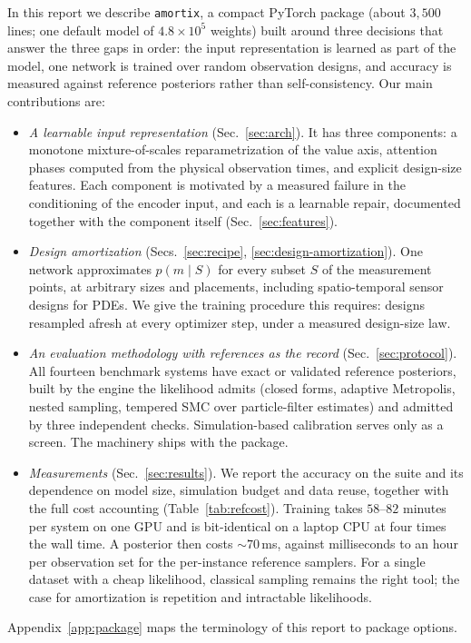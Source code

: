 \documentclass[10pt]{article}
\newcommand{\amortix}{\texttt{amortix}}
\begin{document}
In this report we describe \amortix, a compact PyTorch package (about $3{,}500$ lines; one default
model of $4.8 \times 10^5$ weights) built around three decisions that answer the three gaps in order:
the input representation is learned as part of the model, one network is trained over random
observation designs, and accuracy is measured against reference posteriors rather than
self-consistency. Our main contributions are:
\begin{itemize}
  \item \emph{A learnable input representation} (Sec.~\ref{sec:arch}). It has three components: a
  monotone mixture-of-scales reparametrization of the value axis, attention phases computed from the
  physical observation times, and explicit design-size features. Each component is motivated by a
  measured failure in the conditioning of the encoder input, and each is a learnable repair,
  documented together with the component itself (Sec.~\ref{sec:features}).
  \item \emph{Design amortization} (Secs.~\ref{sec:recipe}, \ref{sec:design-amortization}). One
  network approximates $p(m \mid S)$ for every subset $S$ of the measurement points, at arbitrary
  sizes and placements, including spatio-temporal sensor designs for PDEs. We give the training
  procedure this requires: designs resampled afresh at every optimizer step, under a measured
  design-size law.
  \item \emph{An evaluation methodology with references as the record} (Sec.~\ref{sec:protocol}). All
  fourteen benchmark systems have exact or validated reference posteriors, built by the engine the
  likelihood admits (closed forms, adaptive Metropolis, nested sampling, tempered SMC over
  particle-filter estimates) and admitted by three independent checks. Simulation-based calibration
  serves only as a screen. The machinery ships with the package.
  \item \emph{Measurements} (Sec.~\ref{sec:results}). We report the accuracy on the suite and its
  dependence on model size, simulation budget and data reuse, together with the full cost accounting
  (Table~\ref{tab:refcost}). Training takes $58$--$82$ minutes per system on one GPU and is
  bit-identical on a laptop CPU at four times the wall time. A posterior then costs ${\sim}70$\,ms,
  against milliseconds to an hour per observation set for the per-instance reference samplers. For a
  single dataset with a cheap likelihood, classical sampling remains the right tool; the case for
  amortization is repetition and intractable likelihoods.
\end{itemize}
Appendix~\ref{app:package} maps the terminology of this report to package options.
\end{document}
